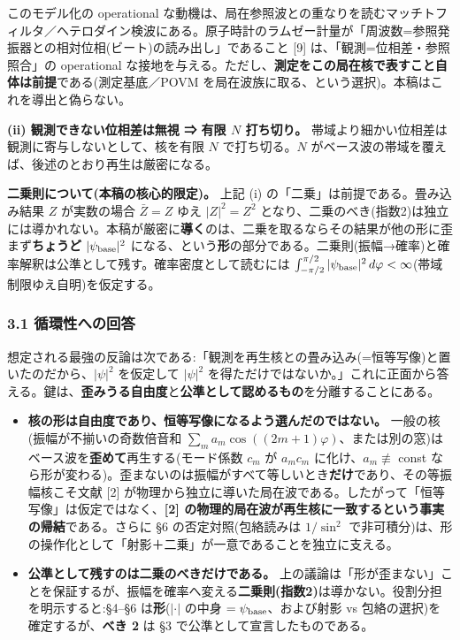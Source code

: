 \documentclass[
]{ltjsarticle}
\providecommand{\tightlist}{%
  \setlength{\itemsep}{0pt}\setlength{\parskip}{0pt}}
\begin{document}
このモデル化の operational
な動機は、局在参照波との重なりを読むマッチトフィルタ／ヘテロダイン検波にある。原子時計のラムゼー計量が「周波数=参照発振器との相対位相(ビート)の読み出し」であること
{[}9{]} は、「観測=位相差・参照照合」の operational
な接地を与える。ただし、\textbf{測定をこの局在核で表すこと自体は前提}である(測定基底／POVM
を局在波族に取る、という選択)。本稿はこれを導出と偽らない。

\textbf{(ii) 観測できない位相差は無視 ⇒ 有限 \(N\) 打ち切り。}
帯域より細かい位相差は観測に寄与しないとして、核を有限 \(N\)
で打ち切る。\(N\)
がベース波の帯域を覆えば、後述のとおり再生は厳密になる。

\textbf{二乗則について(本稿の核心的限定)。} 上記 (i)
の「二乗」は前提である。畳み込み結果 \(Z\) が実数の場合 \(\bar Z=Z\)
ゆえ \(|Z|^2=Z^2\)
となり、二乗のべき(指数2)は独立には導かれない。本稿が厳密に\textbf{導く}のは、二乗を取るならその結果が他の形に歪まず\textbf{ちょうど}
\(|\psi_{\rm base}|^2\)
になる、という\textbf{形}の部分である。二乗則(振幅→確率)と確率解釈は公準として残す。確率密度として読むには
\(\int_{-\pi/2}^{\pi/2}|\psi_{\rm base}|^2\,d\varphi<\infty\)(帯域制限ゆえ自明)を仮定する。

\subsubsection{3.1
循環性への回答}\label{ux5faaux74b0ux6027ux3078ux306eux56deux7b54}

想定される最強の反論は次である:「観測を再生核との畳み込み(=恒等写像)と置いたのだから、\(|\psi|^2\)
を仮定して \(|\psi|^2\)
を得ただけではないか。」これに正面から答える。鍵は、\textbf{歪みうる自由度}と\textbf{公準として認めるもの}を分離することにある。

\begin{itemize}
\tightlist
\item
  \textbf{核の形は自由度であり、恒等写像になるよう選んだのではない。}
  一般の核(振幅が不揃いの奇数倍音和
  \(\sum_m a_m\cos((2m+1)\varphi)\)、または別の窓)はベース波を\textbf{歪めて}再生する(モード係数
  \(c_m\) が \(a_m c_m\) に化け、\(a_m\not\equiv\) const
  なら形が変わる)。歪まないのは振幅がすべて等しいとき\textbf{だけ}であり、その等振幅核こそ文献
  {[}2{]}
  が物理から独立に導いた局在波である。したがって「恒等写像」は仮定ではなく、\textbf{{[}2{]}
  の物理的局在波が再生核に一致するという事実の帰結}である。さらに §6
  の否定対照(包絡読みは \(1/\sin^2\)
  で非可積分)は、形の操作化として「射影＋二乗」が一意であることを独立に支える。
\item
  \textbf{公準として残すのは二乗のべきだけである。}
  上の議論は「形が歪まない」ことを保証するが、振幅を確率へ変える\textbf{二乗則(指数2)}は導かない。役割分担を明示すると:§4--§6
  は\textbf{形}(\(|\cdot|\) の中身 \(=\psi_{\rm base}\)、および射影 vs
  包絡の選択)を確定するが、\textbf{べき 2} は §3
  で公準として宣言したものである。
\end{itemize}
\end{document}
